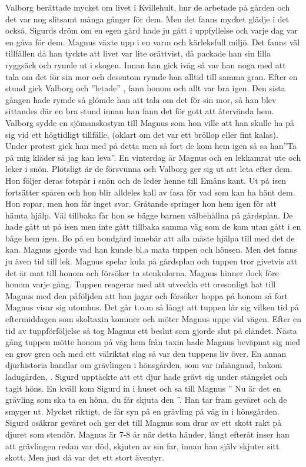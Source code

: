 Valborg berättade mycket om livet i Kvillehult, hur de arbetade på gården och det var nog slitsamt  många gånger för dem. Men det fanns mycket glädje i det också. Sigurds dröm om en egen gård hade ju gått i uppfyllelse och varje dag var en gåva för dem. Magnus växte upp i en varm och kärleksfull miljö. Det fanns väl tillfällen då han tyckte att livet var lite orättvist, då packade han sin lilla ryggsäck och rymde ut i skogen. Innan han gick iväg så var han noga med att tala om det för sin mor och dessutom rymde han alltid till samma gran. Efter en stund gick Valborg och ”letade” , fann honom och allt var bra igen. Den sista gången hade rymde så glömde han att tala om det för sin mor, så han blev sittandes där en bra stund innan han fann det för gott att återvända hem. 
Valborg sydde en sjömanskostym till Magnus som hon ville att han skulle ha på sig vid ett högtidligt tillfälle, (oklart om det var ett bröllop eller fint kalas). Under protest gick han med på detta men så fort de kom hem igen så sa han”Ta på mig kläder så jag kan leva”.
En vinterdag är Magnus och en lekkamrat ute och leker i snön. Plötsligt är de försvunna och Valborg ger sig ut att leta efter dem. Hon följer deras fotspår i snön och de leder henne till Emåns kant. Ut på isen fortsätter spåren och hon blir alldeles kall av fasa för vad som kan ha hänt dem. Hon ropar, men hon får inget svar. Gråtande springer hon hem igen för att hämta hjälp. Väl tillbaka får hon se bägge barnen välbehållna på gårdsplan. De hade gått ut på isen men inte gått tillbaka samma väg som de kom utan gått i en båge  hem igen.
Bo på en bondgård innebär att alla måste hjälpa till med det de kan. Magnus gjorde vad han kunde bl.a mata tuppen och hönsen. Men det fanns ju även tid till lek. Magnus spelar kula på gårdsplan och tuppen tror givetvis att det är mat till honom och försöker ta stenkulorna. Magnus hinner dock före honom varje gång. Tuppen reagerar med att utveckla ett oresonligt hat till Magnus med den påföljden att han jagar och försöker hoppa på honom så fort Magnus visar sig utomhus. Det går t.o.m så långt att tuppen lär sig vilken tid på eftermiddagen som skoltaxin kommer och möter Magnus uppe vid vägen. Efter en tid av tuppförföljelse så tog Magnus ett beslut som gjorde slut på eländet. Nästa gång tuppen mötte honom på väg hem från taxin hade Magnus beväpnat sig med en grov gren och med ett välriktat slag så var den tuppens liv över. En annan djurhistoria handlar om grävlingen i hönsgården, som var inhängnad, bakom ladugården, . Sigurd upptäckte att ett djur hade grävt sig under stängslet och tagit höns. En kväll kom Sigurd in i huset och sa till Magnus ” Nu är det en grävling som ska ta en höna, du får skjuta den ”. Han tar fram geväret och de smyger ut. Mycket riktigt, de får syn på en grävling på väg in i hönsgården. Sigurd osäkrar geväret och ger det till Magnus som drar av ett skott rakt på djuret som stendör. Magnus är 7-8 år när detta händer, långt efteråt inser han att grävlingen redan var död, skjuten av sin far, innan han själv skjuter sitt skott. Men just då var det ett stort äventyr.

